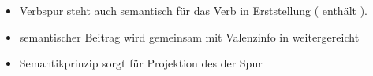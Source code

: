 {{\hspace{1em}
\begin{itemize}
\item Verbspur steht auch semantisch für das Verb in Erststellung ( enthält \cont).

\item semantischer Beitrag wird gemeinsam mit Valenzinfo in \dsl weitergereicht

\item Semantikprinzip sorgt für Projektion des \contws der Spur


\end{itemize}}}
